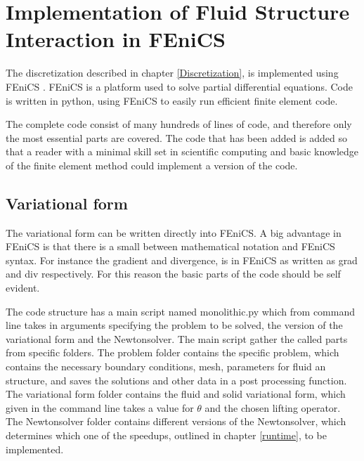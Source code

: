 \begin{comment}
\lstdefinelanguage{Python}{
 keywords={typeof, null, catch, switch, in, int, str, float, self},
 ndkeywords={boolean, throw, import},
 ndkeywords={return, class, if ,elif, endif, while, do, else, True, False , catch, def},
 ndkeywordstyle=\color{blue}\bfseries,
 identifierstyle=\color{black},
 sensitive=false,
 comment=[l]{\#},
 morecomment=[s]{/*}{*/},
 commentstyle=\color{purple}\ttfamily,
 stringstyle=\color{red}\ttfamily,
 backgroundcolor = \color{lightgray}
}
\end{comment}


\chapter{Implementation of Fluid Structure Interaction in FEniCS}
The discretization described in chapter \ref{Discretization}, is implemented using FEniCS \cite{FENICS}. FEniCS is a platform used to solve partial differential equations. Code is written in python, using FEniCS to easily run efficient finite element code. \newline

The complete code consist of many hundreds of lines of code, and therefore only the most essential parts are covered. The code that has been added is added so that a reader with a minimal skill set in scientific computing and basic knowledge of the finite element method could implement a version of the code.

\section{Variational form}

The variational form can be written directly into FEniCS. A big advantage in FEniCS is that there is a small  between mathematical notation and FEniCS syntax. For instance the gradient and divergence, is in FEniCS as written as grad and div respectively. For this reason the basic parts of the code should be self evident.

The code structure has a main script named monolithic.py which from command line takes in arguments specifying the problem to be solved, the version of the variational form and the Newtonsolver. The main script gather the called parts from specific folders. The problem folder contains the specific problem, which contains the necessary boundary conditions, mesh, parameters for fluid an structure, and saves the solutions and other data in a post processing function. The variational form folder contains the fluid and solid variational form, which given in the command line takes a value for $\theta$ and the chosen lifting operator. The Newtonsolver folder contains different versions of the Newtonsolver, which determines which one of the speedups, outlined in chapter \ref{runtime}, to be implemented.


